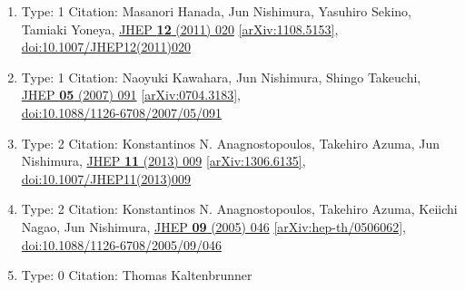\documentclass[a4paper,10pt]{article}
\begin{document}
\begin{enumerate}
\begin{enumerate}
  \item Type: 1 Citation: Masanori Hanada, Jun Nishimura, Yasuhiro Sekino, Tamiaki Yoneya, \href{https://www.doi.org/10.1007/JHEP12(2011)020}{JHEP {\bf 12} (2011) 020}  \href{https://arxiv.org/abs/1108.5153}{[arXiv:1108.5153]},\\\href{https://www.doi.org/10.1007/JHEP12(2011)020}{doi:10.1007/JHEP12(2011)020}
  \item Type: 1 Citation: Naoyuki Kawahara, Jun Nishimura, Shingo Takeuchi, \href{https://www.doi.org/10.1088/1126-6708/2007/05/091}{JHEP {\bf 05} (2007) 091}  \href{https://arxiv.org/abs/0704.3183}{[arXiv:0704.3183]},\\\href{https://www.doi.org/10.1088/1126-6708/2007/05/091}{doi:10.1088/1126-6708/2007/05/091}
  \item Type: 2 Citation: Konstantinos N. Anagnostopoulos, Takehiro Azuma, Jun Nishimura, \href{https://www.doi.org/10.1007/JHEP11(2013)009}{JHEP {\bf 11} (2013) 009}  \href{https://arxiv.org/abs/1306.6135}{[arXiv:1306.6135]},\\\href{https://www.doi.org/10.1007/JHEP11(2013)009}{doi:10.1007/JHEP11(2013)009}
  \item Type: 2 Citation: Konstantinos N. Anagnostopoulos, Takehiro Azuma, Keiichi Nagao, Jun Nishimura, \href{https://www.doi.org/10.1088/1126-6708/2005/09/046}{JHEP {\bf 09} (2005) 046}  \href{https://arxiv.org/abs/hep-th/0506062}{[arXiv:hep-th/0506062]},\\\href{https://www.doi.org/10.1088/1126-6708/2005/09/046}{doi:10.1088/1126-6708/2005/09/046}
  \item Type: 0 Citation: Thomas Kaltenbrunner

\end{enumerate}
\end{enumerate}
\end{document}
